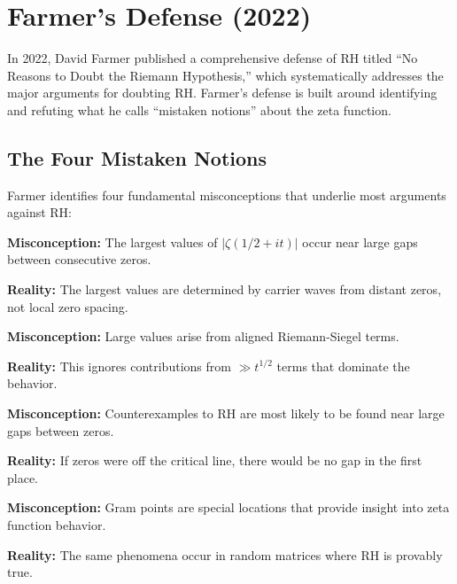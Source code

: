 \section{Farmer's Defense (2022)}
\label{sec:farmer_defense}

In 2022, David Farmer published a comprehensive defense of RH titled ``No Reasons to Doubt the Riemann Hypothesis,'' which systematically addresses the major arguments for doubting RH. Farmer's defense is built around identifying and refuting what he calls ``mistaken notions'' about the zeta function.

\subsection{The Four Mistaken Notions}
\label{subsec:mistaken_notions}

Farmer identifies four fundamental misconceptions that underlie most arguments against RH:

\begin{theorem}
\textbf{Misconception:} The largest values of $|\zeta(1/2 + it)|$ occur near large gaps between consecutive zeros.

\textbf{Reality:} The largest values are determined by carrier waves from distant zeros, not local zero spacing.
\end{theorem}

\begin{theorem} 
\textbf{Misconception:} Large values arise from aligned Riemann-Siegel terms.

\textbf{Reality:} This ignores contributions from $\gg t^{1/2}$ terms that dominate the behavior.
\end{theorem}

\begin{theorem}
\textbf{Misconception:} Counterexamples to RH are most likely to be found near large gaps between zeros.

\textbf{Reality:} If zeros were off the critical line, there would be no gap in the first place.
\end{theorem}

\begin{theorem}
\textbf{Misconception:} Gram points are special locations that provide insight into zeta function behavior.

\textbf{Reality:} The same phenomena occur in random matrices where RH is provably true.
\end{theorem}

